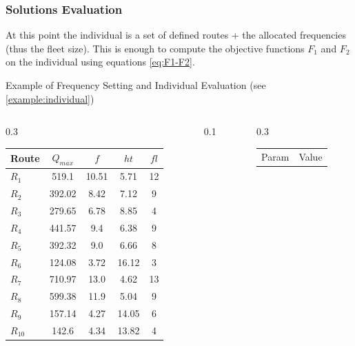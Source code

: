 \documentclass[dvipsnames]{beamer}
\begin{document}
\begin{frame}
  \frametitle{Solutions Evaluation}
    At this point the individual is a set of defined routes + the allocated frequencies (thus the fleet size).
    This is enough to compute the objective functions $F_1$ and $F_2$ on the individual using equations \ref{eq:F1-F2}.

  \begin{exampleblock}{Example of Frequency Setting and Individual Evaluation (see \ref{example:individual})}
    \label{example:fs-ie}
    \begin{columns}
      \hspace{0.25cm}
      \begin{column}{0.3\textwidth}
        \begin{tabular}{|l|c|c|c|c|}
          \hline
          Route & $Q_{max}$ & $f$ & $ht$ & $fl$ \\
          \hline
          \textbf{$R_{1}$} & 519.1 & 10.51 & 5.71 & 12 \\
          \hline
          \textbf{$R_{2}$} & 392.02 & 8.42 & 7.12 & 9 \\
          \hline
          \textbf{$R_{3}$} & 279.65 & 6.78 & 8.85 & 4 \\
          \hline
          \textbf{$R_{4}$} & 441.57 & 9.4 & 6.38 & 9 \\
          \hline
          \textbf{$R_{5}$} & 392.32 & 9.0 & 6.66 & 8 \\
          \hline
          \textbf{$R_{6}$} & 124.08 & 3.72 & 16.12 & 3 \\
          \hline
          \textbf{$R_{7}$} & 710.97 & 13.0 & 4.62 & 13 \\
          \hline
          \textbf{$R_{8}$} & 599.38 & 11.9 & 5.04 & 9 \\
          \hline
          \textbf{$R_{9}$} & 157.14 & 4.27 & 14.05 & 6 \\
          \hline
          \textbf{$R_{10}$} & 142.6 & 4.34 & 13.82 & 4 \\
          \hline
        \end{tabular}
      \end{column}
      \begin{column}{0.1\textwidth}
      \end{column}
      \begin{column}{0.3\textwidth}
        \begin{tabular}{|l|c|}
          \hline
          Param & Value \\

\end{tabular}
\end{column}
\end{columns}
\end{exampleblock}
\end{frame}
\end{document}
